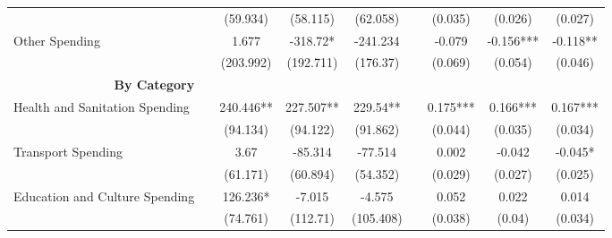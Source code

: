 \begin{table}[H]
\begin{footnotesize}
\begin{center}
{\begin{threeparttable}[b]
\begin{tabular}{rrrrrrrrr}
          &       & \multicolumn{1}{c}{(59.934)} & \multicolumn{1}{c}{(58.115)} & \multicolumn{1}{c}{(62.058)} &       & \multicolumn{1}{c}{(0.035)} & \multicolumn{1}{c}{(0.026)} & \multicolumn{1}{c}{(0.027)} \\
    \multicolumn{1}{l}{\multirow{2}[0]{*}{Other Spending}} &       & \multicolumn{1}{c}{1.677} & \multicolumn{1}{c}{-318.72*} & \multicolumn{1}{c}{-241.234} &       & \multicolumn{1}{c}{-0.079} & \multicolumn{1}{c}{-0.156***} & \multicolumn{1}{c}{-0.118**} \\
          &       & \multicolumn{1}{c}{(203.992)} & \multicolumn{1}{c}{(192.711)} & \multicolumn{1}{c}{(176.37)} &       & \multicolumn{1}{c}{(0.069)} & \multicolumn{1}{c}{(0.054)} & \multicolumn{1}{c}{(0.046)} \\
    \multicolumn{1}{p{15.145em}}{\textbf{By Category}} &       &       &       &       &       &       &       &  \\
    \multicolumn{1}{l}{\multirow{2}[0]{*}{Health and Sanitation Spending}} &       & \multicolumn{1}{c}{240.446**} & \multicolumn{1}{c}{227.507**} & \multicolumn{1}{c}{229.54**} &       & \multicolumn{1}{c}{0.175***} & \multicolumn{1}{c}{0.166***} & \multicolumn{1}{c}{0.167***} \\
          &       & \multicolumn{1}{c}{(94.134)} & \multicolumn{1}{c}{(94.122)} & \multicolumn{1}{c}{(91.862)} &       & \multicolumn{1}{c}{(0.044)} & \multicolumn{1}{c}{(0.035)} & \multicolumn{1}{c}{(0.034)} \\
    \multicolumn{1}{l}{\multirow{2}[0]{*}{Transport Spending}} &       & \multicolumn{1}{c}{3.67} & \multicolumn{1}{c}{-85.314} & \multicolumn{1}{c}{-77.514} &       & \multicolumn{1}{c}{0.002} & \multicolumn{1}{c}{-0.042} & \multicolumn{1}{c}{-0.045*} \\
          &       & \multicolumn{1}{c}{(61.171)} & \multicolumn{1}{c}{(60.894)} & \multicolumn{1}{c}{(54.352)} &       & \multicolumn{1}{c}{(0.029)} & \multicolumn{1}{c}{(0.027)} & \multicolumn{1}{c}{(0.025)} \\
    \multicolumn{1}{l}{\multirow{2}[0]{*}{Education and Culture Spending}} &       & \multicolumn{1}{c}{126.236*} & \multicolumn{1}{c}{-7.015} & \multicolumn{1}{c}{-4.575} &       & \multicolumn{1}{c}{0.052} & \multicolumn{1}{c}{0.022} & \multicolumn{1}{c}{0.014} \\
          &       & \multicolumn{1}{c}{(74.761)} & \multicolumn{1}{c}{(112.71)} & \multicolumn{1}{c}{(105.408)} &       & \multicolumn{1}{c}{(0.038)} & \multicolumn{1}{c}{(0.04)} & \multicolumn{1}{c}{(0.034)} \\

\end{tabular}
\end{threeparttable}}
\end{center}
\end{footnotesize}
\end{table}
